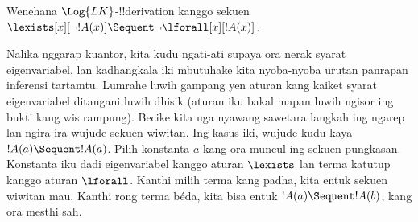 \documentclass[../../../include/open-logic-section]{subfiles}
\begin{document}


\begin{ex}
Wenehana $\Log{LK}$-!!{derivation} kanggo sekuen $\lexists[x][\lnot !A(x)]
\Sequent \lnot \lforall[x][!A(x)]$.

Nalika nggarap kuantor, kita kudu ngati-ati supaya ora nerak syarat
eigenvariabel, lan kadhangkala iki mbutuhake kita nyoba-nyoba urutan
panrapan inferensi tartamtu. Lumrahe luwih gampang yen aturan kang
kaiket syarat eigenvariabel ditangani luwih dhisik (aturan iku bakal
mapan luwih ngisor ing bukti kang wis rampung). Becike kita uga nyawang
sawetara langkah ing ngarep lan ngira-ira wujude sekuen wiwitan. Ing
kasus iki, wujude kudu kaya $!A(a) \Sequent !A(a)$. Pilih konstanta $a$ kang ora muncul ing sekuen-pungkasan.
Konstanta iku dadi eigenvariabel kanggo aturan $\lexists$ lan terma
katutup kanggo aturan $\lforall$. Kanthi milih terma kang padha, kita
entuk sekuen wiwitan mau. Kanthi rong terma béda, kita bisa entuk
$!A(a) \Sequent !A(b)$, kang ora mesthi sah.


\end{ex}
\end{document}

